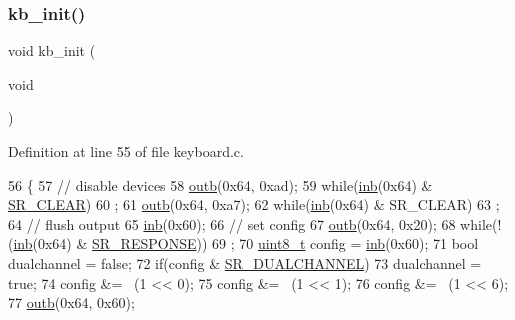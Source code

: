 \subsubsection{\texorpdfstring{kb\+\_\+init()}{kb\_init()}}
{\footnotesize\ttfamily void kb\+\_\+init (\begin{DoxyParamCaption}\item[{void}]{ }\end{DoxyParamCaption})}



Definition at line 55 of file keyboard.\+c.


\begin{DoxyCode}
56 \{
57     \textcolor{comment}{// disable devices}
58     \hyperlink{a00164_aa37f5841c54156a4b14fc0d6f626b44f_aa37f5841c54156a4b14fc0d6f626b44f}{outb}(0x64, 0xad);
59     \textcolor{keywordflow}{while}(\hyperlink{a00164_a0223c8898dfec29069879dc51076e28a_a0223c8898dfec29069879dc51076e28a}{inb}(0x64) & \hyperlink{a00038_a8aa66e8bc828742fb4819d7cd2df598d_a8aa66e8bc828742fb4819d7cd2df598d}{SR\_CLEAR})
60         ;
61     \hyperlink{a00164_aa37f5841c54156a4b14fc0d6f626b44f_aa37f5841c54156a4b14fc0d6f626b44f}{outb}(0x64, 0xa7);
62     \textcolor{keywordflow}{while}(\hyperlink{a00164_a0223c8898dfec29069879dc51076e28a_a0223c8898dfec29069879dc51076e28a}{inb}(0x64) & SR\_CLEAR)
63         ;
64     \textcolor{comment}{// flush output}
65     \hyperlink{a00164_a0223c8898dfec29069879dc51076e28a_a0223c8898dfec29069879dc51076e28a}{inb}(0x60);
66     \textcolor{comment}{// set config}
67     \hyperlink{a00164_aa37f5841c54156a4b14fc0d6f626b44f_aa37f5841c54156a4b14fc0d6f626b44f}{outb}(0x64, 0x20);
68     \textcolor{keywordflow}{while}(!(\hyperlink{a00164_a0223c8898dfec29069879dc51076e28a_a0223c8898dfec29069879dc51076e28a}{inb}(0x64) & \hyperlink{a00038_ac9efa716f8185bae296975136b510c30_ac9efa716f8185bae296975136b510c30}{SR\_RESPONSE}))
69         ;
70     \hyperlink{a00140_aba7bc1797add20fe3efdf37ced1182c5_aba7bc1797add20fe3efdf37ced1182c5}{uint8\_t} config = \hyperlink{a00164_a0223c8898dfec29069879dc51076e28a_a0223c8898dfec29069879dc51076e28a}{inb}(0x60);
71     \textcolor{keywordtype}{bool} dualchannel = \textcolor{keyword}{false};
72     \textcolor{keywordflow}{if}(config & \hyperlink{a00038_addafe32b109f94a57ae4bf1a1dca05e0_addafe32b109f94a57ae4bf1a1dca05e0}{SR\_DUALCHANNEL})
73         dualchannel = \textcolor{keyword}{true};
74     config &= ~(1 << 0);
75     config &= ~(1 << 1);
76     config &= ~(1 << 6);
77     \hyperlink{a00164_aa37f5841c54156a4b14fc0d6f626b44f_aa37f5841c54156a4b14fc0d6f626b44f}{outb}(0x64, 0x60);

\end{DoxyCode}
